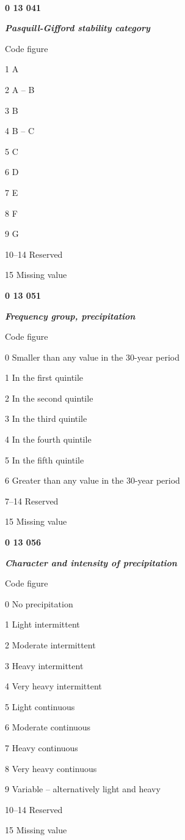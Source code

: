 \textbf{\\
}

\textbf{0 13 041}

\emph{\textbf{Pasquill-Gifford stability category}}

Code figure

1 A

2 A -- B

3 B

4 B -- C

5 C

6 D

7 E

8 F

9 G

10--14 Reserved

15 Missing value

\textbf{0 13 051}

\emph{\textbf{Frequency group, precipitation}}

Code figure

0 Smaller than any value in the 30-year period

1 In the first quintile

2 In the second quintile

3 In the third quintile

4 In the fourth quintile

5 In the fifth quintile

6 Greater than any value in the 30-year period

7--14 Reserved

15 Missing value

\textbf{0 13 056}

\emph{\textbf{Character and intensity of precipitation}}

Code figure

0 No precipitation

1 Light intermittent

2 Moderate intermittent

3 Heavy intermittent

4 Very heavy intermittent

5 Light continuous

6 Moderate continuous

7 Heavy continuous

8 Very heavy continuous

9 Variable -- alternatively light and heavy

10--14 Reserved

15 Missing value

